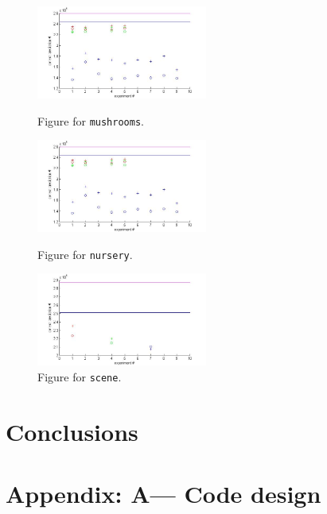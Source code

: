 \documentclass[12pt, a4paper, pdflatex]{report}
\begin{document}
\begin{figure}[htbp]
	\centering
	\includegraphics[width=0.5\textwidth]{graphics/figures/fig1.jpg}
	\begin{tiny}
		\caption{\small Figure for \texttt{mushrooms}.\label{img:mushrooms}}
	\end{tiny}

	\includegraphics[width=0.5\textwidth]{graphics/figures/fig2.jpg}
	\begin{tiny}
		\caption{\small Figure for \texttt{nursery}.\label{img:nursery}}
	\end{tiny}

	\includegraphics[width=0.5\textwidth]{graphics/figures/fig3.jpg}
	\begin{tiny}
		\caption{\small Figure for \texttt{scene}.\label{img:scene}}
	\end{tiny}
\end{figure}


\section{Conclusions}
\lipsum[1-3]




\newpage
\section*{Appendix: A--- Code design\label{ap:code}}




{}
\end{document}
